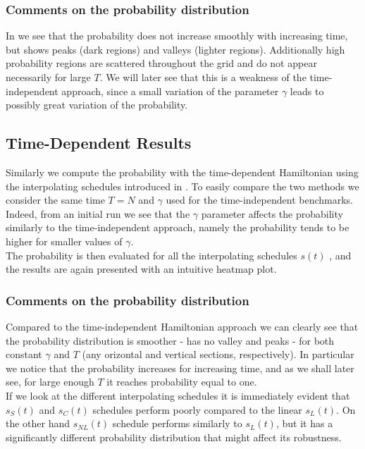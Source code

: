         \subsubsection*{Comments on the probability distribution}
        In  we see that the probability does not increase smoothly with increasing time, but shows peaks (dark regions) and valleys (lighter regions). Additionally high probability regions are scattered throughout the grid and do not appear necessarily for large $T$. We will later see that this is a weakness of the time-independent approach, since a small variation of the parameter $\gamma$ leads to possibly great variation of the probability.

    \subsection{Time-Dependent Results}\label{subsec:time_dependent_results}
        Similarly we compute the probability with the time-dependent Hamiltonian using the interpolating schedules introduced in . To easily compare the two methods we consider the same time $T=N$ and $\gamma$ used for the time-independent benchmarks. Indeed, from an initial run we see that the $\gamma$ parameter affects the probability similarly to the time-independent approach, namely the probability tends to be higher for smaller values of $\gamma$.\\
        The probability is then evaluated for all the interpolating schedules $s(t)$ , and the results are again presented with an intuitive heatmap plot.\\
        

        \subsubsection*{Comments on the probability distribution}
        Compared to the time-independent Hamiltonian approach we can clearly see that the probability distribution is smoother - has no valley and peaks - for both constant $\gamma$ and $T$ (any orizontal and vertical sections, respectively). In particular we notice that the probability increases for increasing time, and as we shall later see, for large enough $T$ it reaches probability equal to one.\\ If we look at the different interpolating schedules it is immediately evident that $s_S(t)$ and $s_C(t)$ schedules perform poorly compared to the linear $s_L(t)$. On the other hand $s_{NL}(t)$ schedule performs similarly to $s_L(t)$, but it has a significantly different probability distribution that might affect its robustness.


